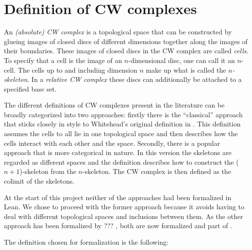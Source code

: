\section{Definition of CW complexes}

An \emph{(absolute) CW complex} is a topological space that can be constructed by glueing images of closed discs of different dimensions together along the images of their boundaries. 
These images of closed discs in the CW complex are called \emph{cells}.
To specify that a cell is the image of an $n$-dimensional disc, one can call it an $n$-cell.
The cells up to and including dimension $n$ make up what is called the \emph{$n$-skeleton}.
In a \emph{relative CW complex} these discs can additionally be attached to a specified base set. 

The different definitions of CW complexes present in the literature can be broadly categorized into two approaches: firstly there is the ``classical'' approach that sticks closely in style to Whitehead's original definition in \cite{Whitehead2018}.
This definition assumes the cells to all lie in one topological space and then describes how the cells interact with each other and the space.
Secondly, there is a popular approach that is more categorical in nature. 
In this version the skeletons are regarded as different spaces and the definition describes how to construct the ($n+1$)-skeleton from the $n$-skeleton. 
The CW complex is then defined as the colimit of the skeletons. 

At the start of this project neither of the approaches had been formalized in Lean. 
We chose to proceed with the former approach because it avoids having to deal with different topological spaces and inclusions between them. 
As the other approach has been formalized by ??? , both are now formalized and part of \mathlib. 

The definition chosen for formalization is the following: 

